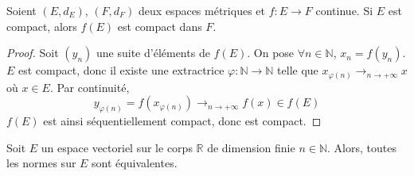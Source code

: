   \begin{proposition}
    \label{equivalence-des-normes-en-dimension-finie-et-theoreme-de-riesz-2}
    Soient $(E,d_E)$, $(F,d_F)$ deux espaces métriques et $f : E \rightarrow F$ continue. Si $E$ est compact, alors $f(E)$ est compact dans $F$.
  \end{proposition}

  \begin{proof}
    Soit $(y_n)$ une suite d'éléments de $f(E)$. On pose $\forall n \in \mathbb{N}$, $x_n = f(y_n)$. $E$ est compact, donc il existe une extractrice $\varphi : \mathbb{N} \rightarrow \mathbb{N}$ telle que $x_{\varphi(n)} \longrightarrow_{n \rightarrow +\infty} x$ où $x \in E$. Par continuité,
    \[ y_{\varphi(n)} = f(x_{\varphi(n)}) \longrightarrow_{n \rightarrow +\infty} f(x) \in f(E) \]
    $f(E)$ est ainsi séquentiellement compact, donc est compact.
  \end{proof}

  \begin{theorem}
    Soit $E$ un espace vectoriel sur le corps $\mathbb{R}$ de dimension finie $n \in \mathbb{N}$. Alors, toutes les normes sur $E$ sont équivalentes.
  \end{theorem}

